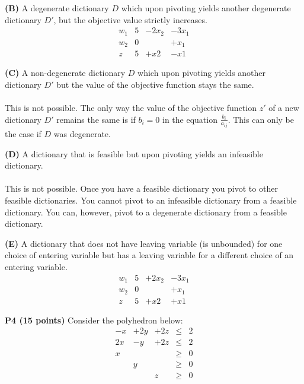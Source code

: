 \documentclass[11pt]{article}
\begin{document}
\medskip

\noindent\textbf{(B)} A degenerate dictionary $D$ which upon pivoting
yields another degenerate dictionary $D'$, but the objective value strictly
increases.
\\
\[\begin{array}{r|cccc}
w_1 & 5 & -2x_2 & -3x_1\\ 
w_2 & 0 && +x_1 \\
\hline
z & 5 & +x2 & -x1
\end{array}\]  

\medskip

\noindent\textbf{(C)} A non-degenerate dictionary $D$ which upon pivoting
yields another dictionary $D'$ but the value of the objective function
stays the same.
\\
\\
This is not possible.  The only way the value of the objective function $z'$ of a new dictionary $D'$ remains the same is if $b_i = 0$ in the equation $\frac{b_i}{a_{ij}}$.  This can only be the case if $D$ was degenerate.

\medskip

\noindent\textbf{(D)} A dictionary that is feasible but upon pivoting
yields an infeasible dictionary.
\\
\\
This is not possible.  Once you have a feasible dictionary you pivot to other feasible dictionaries.  You cannot pivot to an infeasible dictionary from a feasible dictionary.  You can, however, pivot to a degenerate dictionary from a feasible dictionary.

\medskip

\noindent\textbf{(E)} A dictionary that does not have leaving variable
(is unbounded) for one choice of entering variable but has a leaving
variable for a different choice of an entering variable.
\\
\[\begin{array}{r|cccc}
w_1 & 5 & +2x_2 & -3x_1\\ 
w_2 & 0 && +x_1 \\
\hline
z & 5 & +x2 & +x1
\end{array}\] 


\bigskip

\noindent\textbf{P4 (15 points)}  Consider the polyhedron below:
\[\begin{array}{ccccc}
 -x & + 2 y & + 2z & \leq & 2 \\
2 x & - y & + 2z & \leq & 2 \\
x & & & \geq & 0\\
& y& & \geq & 0 \\
& & z & \geq & 0 \\
\end{array}\]
\end{document}
